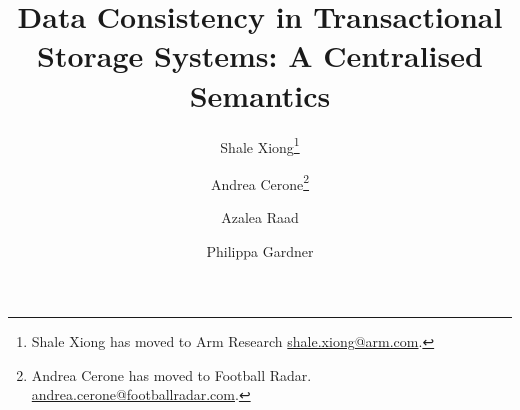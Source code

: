\documentclass[a4paper,UKenglish,cleveref,autoref,thm-restate]{lipics-v2019}
\title{Data Consistency in Transactional Storage Systems: A Centralised Semantics}
\author{Shale Xiong\footnote{Shale Xiong has moved to Arm Research \url{shale.xiong@arm.com}.}}
       {Department of Computing, Imperial College London, UK}{shale.xiong14@ic.ac.uk}
       {[orcid]}
       {The Department of Computing, Imperial College London, and EPSRC Fellowship 'VeTSpec: Verified Trustworthy Software Specification' (EP/R034567/1)}
\author{Andrea Cerone\footnote{Andrea Cerone has moved to Football Radar. \url{andrea.cerone@footballradar.com}.}}
       {Department of Computing, Imperial College London, UK}
       {andrea.cerone@fic.ac.uk}
       {[orcid]}
       {EPSRC Programme Grant 'REMS: Rigorous Engineering for Mainstream Systems' (EP/K008528/1)}
\author{Azalea Raad}
       {MPI-SWS, Germany}
       {azalea@mpi-sws.org}
       {[orcid]}
       {[funding]}
\author{Philippa Gardner}
       {Department of Computing, Imperial College London, UK}
       {p.gardner@ic.ac.uk}
       {[orcid]}
       {EPSRC Programme Grant 'REMS: Rigorous Engineering for Mainstream Systems' (EP/K008528/1), and EPSRC Fellowship 'VeTSpec: Verified Trustworthy Software Specification' (EP/R034567/1)}
\newcommand{\RootPath}{.}
\begin{document}
\maketitle

\begin{abstract}

\end{abstract}





%




\appendix

\end{document}
